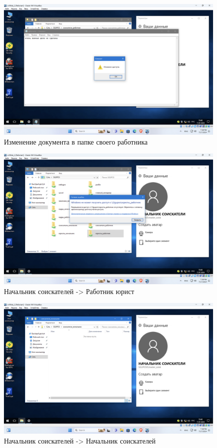 \begin{figure}[H]
  \centering
  \includegraphics[width=1\textwidth]{pict/prac/36}
  \caption{Изменение документа в папке своего работника}
  \label{fig:35}
\end{figure}

\begin{figure}[H]
  \centering
  \includegraphics[width=1\textwidth]{pict/prac/39}
  \caption{Начальник соискателей -> Работник юрист}
  \label{fig:38}
\end{figure}

\begin{figure}[H]
  \centering
  \includegraphics[width=1\textwidth]{pict/prac/37}
  \caption{Начальник соискателей -> Начальник соискателей}
  \label{fig:36}
\end{figure}

